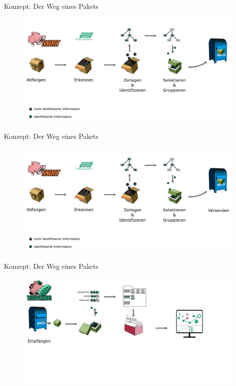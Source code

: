 \begin{frame}{Konzept: Der Weg eines Pakets}
	\begin{figure}
		\centering
		\includegraphics[width=\textwidth]{./images/path_snort/4.png}
	\end{figure}
\end{frame}

\begin{frame}{Konzept: Der Weg eines Pakets}
	\begin{figure}
		\centering
		\includegraphics[width=\textwidth]{./images/path_snort/5.png}
	\end{figure}
\end{frame}


\begin{frame}{Konzept: Der Weg eines Pakets}
	\begin{figure}
		\centering
		\includegraphics[width=\textwidth]{./images/path_trufflehog/1.png}
	\end{figure}
\end{frame}

